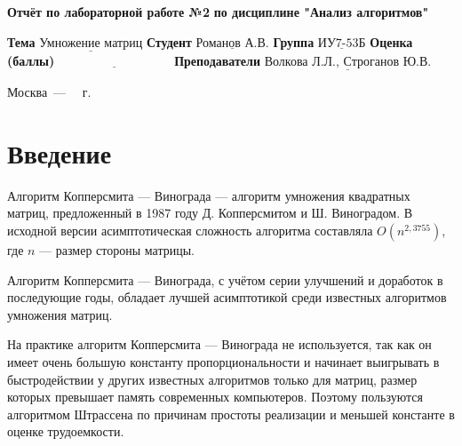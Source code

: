 \documentclass[12pt]{report}
\begin{document}
\begin{titlepage}
	
	\begin{center}
		\noindent\begin{minipage}{1.3\textwidth}\centering
			\Large\textbf{  Отчёт по лабораторной работе №2}\newline
			\textbf{по дисциплине "Анализ алгоритмов"}\newline\newline
		\end{minipage}
	\end{center}
	
	\noindent\textbf{Тема} $\underline{\text{Умножение матриц}}$\newline\newline
	\noindent\textbf{Студент} $\underline{\text{Романов А.В.}}$\newline\newline
	\noindent\textbf{Группа} $\underline{\text{ИУ7-53Б}}$\newline\newline
	\noindent\textbf{Оценка (баллы)} $\underline{\text{~~~~~~~~~~~~~~~~~~~~~~~~~~~}}$\newline\newline
	\noindent\textbf{Преподаватели} $\underline{\text{Волкова Л.Л., Строганов Ю.В.}}$\newline\newline\newline
	
	\begin{center}
		\vfill
		Москва~---~\the\year
		~г.
	\end{center}
\end{titlepage}


\tableofcontents

\newpage
\chapter*{Введение}
Алгоритм Копперсмита — Винограда — алгоритм умножения квадратных матриц, предложенный в 1987 году Д. Копперсмитом и Ш. Виноградом.
В исходной версии асимптотическая сложность алгоритма составляла $O(n^{2,3755})$, где  $n$ — размер стороны матрицы.

Алгоритм Копперсмита — Винограда, с учётом серии улучшений и доработок в последующие годы, обладает лучшей асимптотикой среди известных алгоритмов умножения матриц.

На практике алгоритм Копперсмита — Винограда не используется, так как он имеет очень большую константу пропорциональности и начинает выигрывать в быстродействии у других известных алгоритмов только для матриц, размер которых превышает память современных компьютеров.
Поэтому пользуются алгоритмом Штрассена по причинам простоты реализации и меньшей константе в оценке трудоемкости.
\end{document}
